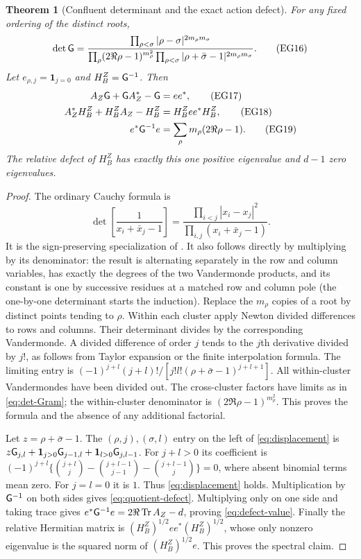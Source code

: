 \documentclass[11pt]{article}
\newtheorem{theorem}{Theorem}[section]
\begin{document}
\begin{theorem}[Confluent determinant and the exact action defect]
\label{thm:Cauchy-displacement}
For any fixed ordering of the distinct roots,
\[
 \det\mathsf G=
 \frac{\prod_{\rho<\sigma}|\rho-\sigma|^{2m_\rho m_\sigma}}
 {\prod_\rho(2\Re\rho-1)^{m_\rho^2}
  \prod_{\rho<\sigma}|\rho+\bar\sigma-1|^{2m_\rho m_\sigma}}.
 \tag{EG16}\label{eq:det-Gram}
\]
Let $e_{\rho,j}=\mathbf1_{j=0}$ and $H_B^Z=\mathsf G^{-1}$. Then
\begin{align}
 A_Z\mathsf G+\mathsf G A_Z^*-\mathsf G&=ee^*,\tag{EG17}\label{eq:displacement}\\
 A_Z^*H_B^Z+H_B^ZA_Z-H_B^Z&=H_B^Zee^*H_B^Z,\tag{EG18}\label{eq:quotient-defect}\\
 e^*\mathsf G^{-1}e&=\sum_\rho m_\rho(2\Re\rho-1).\tag{EG19}\label{eq:defect-value}
\end{align}
The relative defect of $H_B^Z$ has exactly this one positive eigenvalue
and $d-1$ zero eigenvalues.
\end{theorem}
\begin{proof}
The ordinary Cauchy formula is
\[
 \det\left[\frac1{x_i+\bar x_j-1}\right]
 =\frac{\prod_{i<j}|x_i-x_j|^2}{\prod_{i,j}(x_i+\bar x_j-1)}.
\]
It is the sign-preserving specialization of \cite[(1.3.14)]{DLMFCauchy}.
It also follows directly by multiplying by its denominator: the
result is alternating separately in the row and column variables,
has exactly the degrees of the two Vandermonde products, and its
constant is one by successive residues at a matched row and column
pole (the one-by-one determinant starts the induction).
Replace the $m_\rho$ copies of a root by distinct points tending to
$\rho$. Within each cluster apply Newton divided differences to
rows and columns. Their determinant divides by the corresponding
Vandermonde. A divided difference of order $j$ tends to the $j$th
derivative divided by $j!$, as follows from Taylor expansion or
the finite interpolation formula. The limiting entry is
$(-1)^{j+l}(j+l)!/[j!l!(\rho+\bar\sigma-1)^{j+l+1}]$.
All within-cluster Vandermondes have been divided out. The
cross-cluster factors have limits as in \eqref{eq:det-Gram}; the
within-cluster denominator is $(2\Re\rho-1)^{m_\rho^2}$. This
proves the formula and the absence of any additional factorial.

Let $z=\rho+\bar\sigma-1$. The $(\rho,j),(\sigma,l)$ entry on
the left of \eqref{eq:displacement} is
$z\mathsf G_{j,l}+\mathbf1_{j>0}\mathsf G_{j-1,l}
+\mathbf1_{l>0}\mathsf G_{j,l-1}$. For $j+l>0$ its coefficient is
$(-1)^{j+l}\{\binom{j+l}{j}-\binom{j+l-1}{j-1}
-\binom{j+l-1}{j}\}=0$, where absent binomial terms mean zero.
For $j=l=0$ it is $1$. Thus \eqref{eq:displacement} holds.
Multiplication by $\mathsf G^{-1}$ on both sides gives
\eqref{eq:quotient-defect}. Multiplying only on one side and taking
trace gives $e^*\mathsf G^{-1}e=2\Re\operatorname{Tr} A_Z-d$, proving
\eqref{eq:defect-value}. Finally the relative Hermitian matrix is
$(H_B^Z)^{1/2}ee^*(H_B^Z)^{1/2}$, whose only nonzero eigenvalue
is the squared norm of $(H_B^Z)^{1/2}e$. This proves the spectral claim.
\end{proof}
\end{document}
